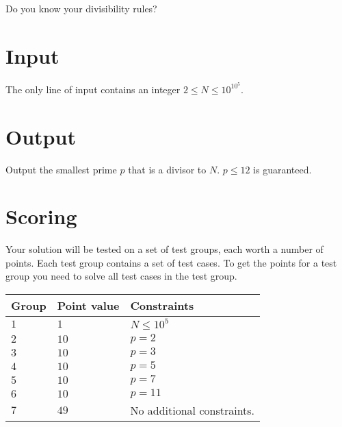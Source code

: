 \noindent
Do you know your divisibility rules?


\section*{Input}
\noindent
The only line of input contains an integer $2 \leq N \leq 10^{10^5}$. 

\section*{Output}
\noindent
Output the smallest prime $p$ that is a divisor to $N$. $p \leq 12$ is guaranteed.


\section*{Scoring}
Your solution will be tested on a set of test groups, each worth a number of points. 
Each test group contains a set of test cases. 
To get the points for a test group you need to solve all test cases in the test group.

\noindent
\begin{tabular}{| l | l | p{12cm} |}
  \hline
  \textbf{Group} & \textbf{Point value} & \textbf{Constraints} \\ \hline
  $1$    & $1$          & $N \leq 10^5$  \\ \hline
  $2$    & $10$         & $p = 2$  \\ \hline
  $3$    & $10$         & $p = 3$  \\ \hline
  $4$    & $10$         & $p = 5$  \\ \hline
  $5$    & $10$         & $p = 7$  \\ \hline
  $6$    & $10$         & $p = 11$  \\ \hline
  $7$    & $49$         & No additional constraints. \\ \hline
\end{tabular}


